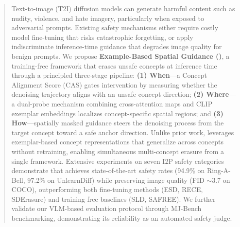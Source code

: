 \begin{abstract}
Text-to-image (T2I) diffusion models can generate harmful content such as nudity, violence, and hate imagery, particularly when exposed to adversarial prompts.
Existing safety mechanisms either require costly model fine-tuning that risks catastrophic forgetting, or apply indiscriminate inference-time guidance that degrades image quality for benign prompts.
We propose \textbf{Example-Based Spatial Guidance (\ours{})}, a training-free framework that erases unsafe concepts at inference time through a principled three-stage pipeline: \textbf{(1) When}---a Concept Alignment Score (CAS) gates intervention by measuring whether the denoising trajectory aligns with an unsafe concept direction; \textbf{(2) Where}---a dual-probe mechanism combining cross-attention maps and CLIP exemplar embeddings localizes concept-specific spatial regions; and \textbf{(3) How}---spatially masked guidance steers the denoising process from the target concept toward a safe anchor direction.
Unlike prior work, \ours{} leverages exemplar-based concept representations that generalize across concepts without retraining, enabling simultaneous multi-concept erasure from a single framework.
Extensive experiments on seven I2P safety categories demonstrate that \ours{} achieves state-of-the-art safety rates (94.9\% on Ring-A-Bell, 97.2\% on UnlearnDiff) while preserving image quality (FID $\sim$3.7 on COCO), outperforming both fine-tuning methods (ESD, RECE, SDErasure) and training-free baselines (SLD, SAFREE).
We further validate our VLM-based evaluation protocol through MJ-Bench benchmarking, demonstrating its reliability as an automated safety judge.
\end{abstract}

